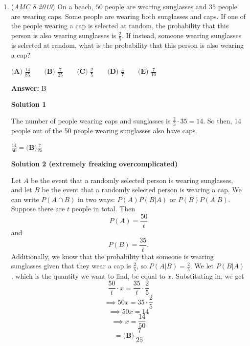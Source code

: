 \begin{enumerate}
 


 



\textbf{Solution 5}

There is a ten day gap, so every time you are 3 days ahead. For Sunday to be the 7th day you must be 6 days ahead, so 6x3 = 18. 18 days prior is the same as 4 days prior to Sunday which is $\boxed{\textbf{(C)}\text{ Wednesday}}$.

 


 Check the box below

 


	\item (\textit{AMC 8 2019}) On a beach, $50$ people are wearing sunglasses and $35$ people are wearing caps. Some people are wearing both sunglasses and caps. If one of the people wearing a cap is selected at random, the probability that this person is also wearing sunglasses is $\frac{2}{5}$. If instead, someone wearing sunglasses is selected at random, what is the probability that this person is also wearing a cap?


 $\textbf{(A) }\frac{14}{85}\qquad\textbf{(B) }\frac{7}{25}\qquad\textbf{(C) }\frac{2}{5}\qquad\textbf{(D) }\frac{4}{7}\qquad\textbf{(E) }\frac{7}{10}$

 \textbf{Answer: }B



\textbf{Solution 1}

The number of people wearing caps and sunglasses is $\frac{2}{5}\cdot35=14$. So then, 14 people out of the 50 people wearing sunglasses also have caps.

 $\frac{14}{50}=\boxed{\textbf{(B)}\frac{7}{25}}$




\textbf{Solution 2 (extremely freaking overcomplicated)}

Let $A$ be the event that a randomly selected person is wearing sunglasses, and let $B$ be the event that a randomly selected person is wearing a cap. We can write $P(A \cap B)$ in two ways: $P(A)P(B|A)$ or $P(B)P(A|B)$. Suppose there are $t$ people in total. Then 
 \[P(A) = \frac{50}{t}\] and 
 \[P(B) = \frac{35}{t}.\] Additionally, we know that the probability that someone is wearing sunglasses given that they wear a cap is $\frac{2}{5}$, so $P(A|B) = \frac{2}{5}$. We let $P(B|A)$, which is the quantity we want to find, be equal to $x$. Substituting in, we get 
 \[\frac{50}{t} \cdot x = \frac{35}{t} \cdot \frac{2}{5}\]
 \[\implies 50x = 35 \cdot \frac{2}{5}\]
 \[\implies 50x = 14\]
 \[\implies x = \frac{14}{50}\]
 \[= \boxed{\textbf{(B)}~\frac{7}{25}}\]


\end{enumerate}
